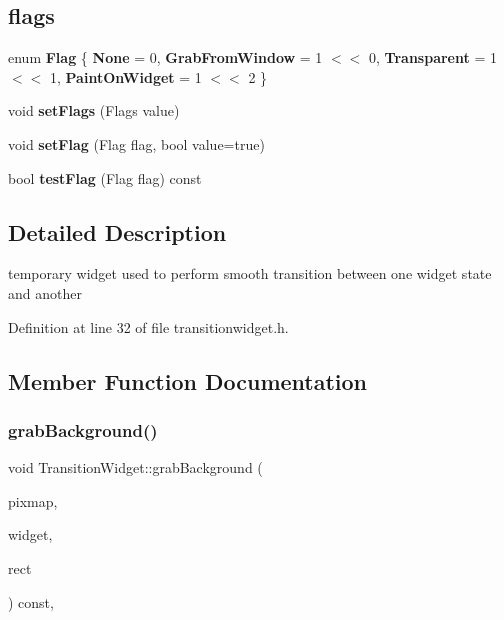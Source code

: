 \subsection*{flags}
\begin{DoxyCompactItemize}
\item 
\mbox{\label{class_transition_widget_a84bc2d09678c14382ebdb239b98f6fa1}} 
enum {\bfseries Flag} \{ {\bfseries None} = 0, 
{\bfseries Grab\+From\+Window} = 1 $<$$<$ 0, 
{\bfseries Transparent} = 1 $<$$<$ 1, 
{\bfseries Paint\+On\+Widget} = 1 $<$$<$ 2
 \}
\item 
\mbox{\label{class_transition_widget_aa0130da696009b462d4a3b0309d5d73d}} 
void {\bfseries set\+Flags} (Flags value)
\item 
\mbox{\label{class_transition_widget_a27f9d3c7a1eae6bd32de6f0fd48a7373}} 
void {\bfseries set\+Flag} (Flag flag, bool value=true)
\item 
\mbox{\label{class_transition_widget_a1265c64ef873f603d74ecce8e4c52606}} 
bool {\bfseries test\+Flag} (Flag flag) const
\end{DoxyCompactItemize}


\subsection{Detailed Description}
temporary widget used to perform smooth transition between one widget state and another 

Definition at line 32 of file transitionwidget.\+h.



\subsection{Member Function Documentation}
\mbox{\label{class_transition_widget_a3658e4ec4c80e864a409ee94f9ac1d74}} 
\subsubsection{\texorpdfstring{grab\+Background()}{grabBackground()}}
{\footnotesize\ttfamily void Transition\+Widget\+::grab\+Background (\begin{DoxyParamCaption}\item[{Q\+Pixmap \&}]{pixmap,  }\item[{Q\+Widget $\ast$}]{widget,  }\item[{Q\+Rect \&}]{rect }\end{DoxyParamCaption}) const\hspace{0.3cm}{\ttfamily [protected]}, {\ttfamily [virtual]}}



